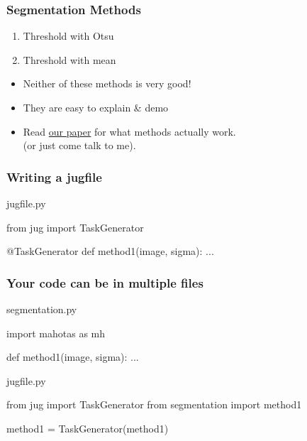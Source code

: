 \documentclass{beamer}
\begin{document}
\begin{frame}[fragile]
\frametitle{Segmentation Methods}


\begin{enumerate}
\item Threshold with Otsu
\item Threshold with mean
\end{enumerate}

\pause

\begin{itemize}
\item Neither of these methods is very good!
\item They are easy to explain \& demo
\item Read \href{http://www.ncbi.nlm.nih.gov/pmc/articles/PMC2901896/}{our paper} for what methods actually work.\\
(or just come talk to me).
\end{itemize}

\end{frame}

\begin{frame}[fragile]
\frametitle{Writing a jugfile}

\begin{block}{jugfile.py}
\begin{python}
from jug import TaskGenerator

@TaskGenerator
def method1(image, sigma):
    ...
\end{python}
\end{block}

\end{frame}


\begin{frame}[fragile]
\frametitle{Your code can be in multiple files}


\begin{block}{segmentation.py}
\begin{python}
import mahotas as mh

def method1(image, sigma):
    ...

\end{python}

\end{block}

\begin{block}{jugfile.py}
\begin{python}
from jug import TaskGenerator
from segmentation import method1

method1 = TaskGenerator(method1)

\end{python}
\end{block}
\end{frame}
\end{document}
